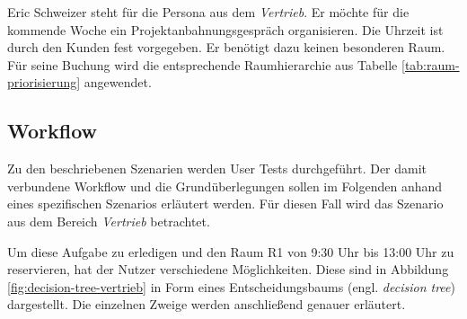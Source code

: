 Eric Schweizer steht für die Persona aus dem \textit{Vertrieb}. Er möchte für die kommende Woche ein Projektanbahnungsgespräch organisieren. Die Uhrzeit ist durch den Kunden fest vorgegeben. Er benötigt dazu keinen besonderen Raum. Für seine Buchung wird die entsprechende Raumhierarchie aus Tabelle \ref{tab:raum-priorisierung} angewendet. 





\subsection{Workflow}
\label{subsec:workflow}

Zu den beschriebenen Szenarien werden User Tests durchgeführt. Der damit verbundene Workflow und die Grundüberlegungen sollen im Folgenden anhand eines spezifischen Szenarios erläutert werden. Für diesen Fall wird das Szenario aus dem Bereich \textit{Vertrieb} betrachtet. 

Um diese Aufgabe zu erledigen und den Raum R1 von 9:30 Uhr bis 13:00 Uhr zu reservieren, hat der Nutzer verschiedene Möglichkeiten. Diese sind in Abbildung \ref{fig:decision-tree-vertrieb} in Form eines Entscheidungsbaums (engl. \textit{decision tree}) dargestellt. Die einzelnen Zweige werden anschließend genauer erläutert.
\newline

